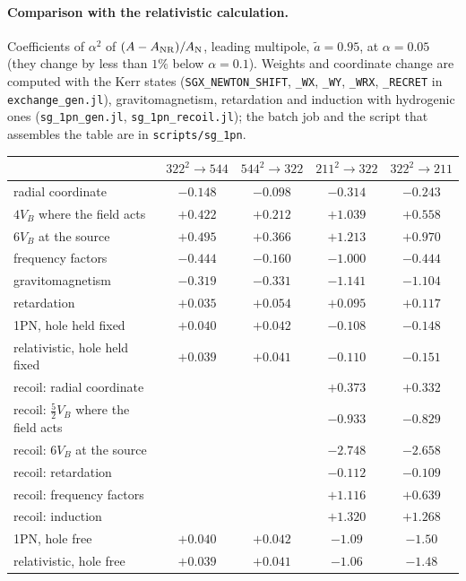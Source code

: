 \documentclass[11pt]{article}
\begin{document}
\paragraph{Comparison with the relativistic calculation.} Coefficients of $\alpha^2$ of $(A-A_{\rm NR})/A_{\rm N}$, leading multipole,
$\tilde a=0.95$, at $\alpha=0.05$ (they change by less than $1\%$ below $\alpha=0.1$). Weights and coordinate change are computed with the Kerr
states (\texttt{SGX\_NEWTON\_SHIFT}, \texttt{\_WX}, \texttt{\_WY}, \texttt{\_WRX}, \texttt{\_RECRET} in \texttt{exchange\_gen.jl}),
gravitomagnetism, retardation and induction with hydrogenic ones (\texttt{sg\_1pn\_gen.jl}, \texttt{sg\_1pn\_recoil.jl}); the batch
job and the script that assembles the table are in \texttt{scripts/sg\_1pn}.
\begin{center}
\begin{tabular}{@{}lcccc@{}}
\toprule
 & $322^2\to544$ & $544^2\to322$ & $211^2\to322$ & $322^2\to211$ \\
\midrule
radial coordinate & $-0.148$ & $-0.098$ & $-0.314$ & $-0.243$ \\
$4V_B$ where the field acts & $+0.422$ & $+0.212$ & $+1.039$ & $+0.558$ \\
$6V_B$ at the source & $+0.495$ & $+0.366$ & $+1.213$ & $+0.970$ \\
frequency factors & $-0.444$ & $-0.160$ & $-1.000$ & $-0.444$ \\
gravitomagnetism & $-0.319$ & $-0.331$ & $-1.141$ & $-1.104$ \\
retardation & $+0.035$ & $+0.054$ & $+0.095$ & $+0.117$ \\
\midrule
1PN, hole held fixed & $+0.040$ & $+0.042$ & $-0.108$ & $-0.148$ \\
relativistic, hole held fixed & $+0.039$ & $+0.041$ & $-0.110$ & $-0.151$ \\
\midrule
recoil: radial coordinate & & & $+0.373$ & $+0.332$ \\
recoil: $\tfrac52V_B$ where the field acts & & & $-0.933$ & $-0.829$ \\
recoil: $6V_B$ at the source & & & $-2.748$ & $-2.658$ \\
recoil: retardation & & & $-0.112$ & $-0.109$ \\
recoil: frequency factors & & & $+1.116$ & $+0.639$ \\
recoil: induction & & & $+1.320$ & $+1.268$ \\
\midrule
1PN, hole free & $+0.040$ & $+0.042$ & $-1.09$ & $-1.50$ \\
relativistic, hole free & $+0.039$ & $+0.041$ & $-1.06$ & $-1.48$ \\
\bottomrule
\end{tabular}
\end{center}
\end{document}
